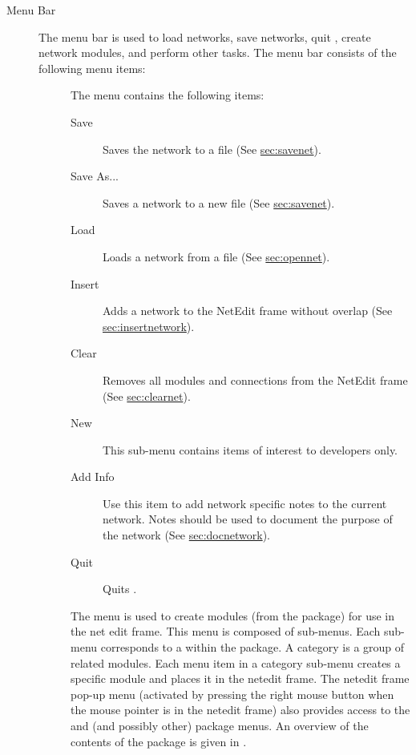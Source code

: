 \begin{description}
\item[Menu Bar] The menu bar is used to load networks, save networks, quit
  \sr{}, create network modules, and perform other tasks.  The menu bar
  consists of the following menu items:

  \begin{description}
  \item[] The  menu contains the following items:
    \begin{description}
    \item[Save] Saves the network to a file (See \hyperref{this
        section}{Section~}{}{sec:savenet}). 
    \item[Save As...] Saves a network to a new file (See
      \hyperref{this section}{Section~}{}{sec:savenet}). 
    \item[Load] Loads a network from a file (See \hyperref{this
        section}{Section~}{}{sec:opennet}). 
    \item[Insert] Adds a network to the NetEdit frame without overlap
      (See \hyperref{this section}{Section~}{}{sec:insertnetwork}). 
    \item[Clear] Removes all modules and connections from the NetEdit
      frame (See \hyperref{this section}{Section~}{}{sec:clearnet}).
    \item[New] This sub-menu contains items of interest to developers only.
    \item[Add Info] Use this item to add network specific notes to
      the current network.  Notes should be used to document the purpose of
      the network (See \hyperref{this section}{Section~}{}{sec:docnetwork}).
    \item[Quit] Quits \sr{}.
    \end{description}
  \end{description}
  
  \begin{description}
  \item[] The  menu is used to create modules
    (from the \sr{} package) for use in the net edit frame.  This menu is
    composed of sub-menus. Each sub-menu corresponds to a 
     within the \sr{} package.  A category is a group of
    related modules.  Each menu item in a category sub-menu creates a
    specific module and places it in the netedit frame.  The netedit frame
    pop-up menu (activated by pressing the right mouse button when the
    mouse pointer is in the netedit frame) also provides access to the
    \menu{\sr{}} and \menu{\biopse{}} (and possibly other) package menus.  An
    overview of the contents of the \sr{} package is given in .
  \end{description}


\end{description}

